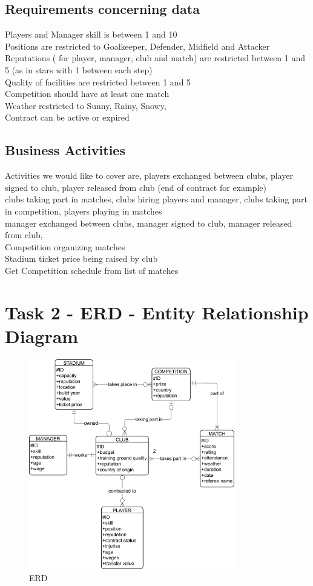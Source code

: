 \documentclass{report}
\begin{document}
\section{Requirements concerning data}
Players and Manager skill is between 1 and 10 \\ 
Positions are restricted to Goalkeeper, Defender, Midfield and Attacker \\ 
Reputations ( for player, manager, club and match) are restricted between 1 and 5 (as in stars with 1 between each step) \\
Quality of facilities are restricted between 1 and 5 \\ 
Competition should have at least one match \\ 
Weather restricted to Sunny, Rainy, Snowy, \\ 
Contract can be active or expired \\

\section{Business Activities}
Activities we would like to cover are, players exchanged between clubs, player signed to club, player released from club (end of contract for example)
\\
clubs taking part in matches, clubs hiring players and manager, clubs taking part in competition, 
players playing in matches \\
manager exchanged between clubs, manager signed to club, manager released from club, \\ 
Competition organizing matches \\
Stadium ticket price being raised by club \\
Get Competition schedule from list of matches 

\chapter{Task 2 - ERD - Entity Relationship Diagram}
\begin{figure}[htpb]
    \centering
    \includegraphics[width=0.8\textwidth]{erd.pdf}
    \caption{ERD}
    \label{fig:tikzpgf}
\end{figure}
\end{document}
